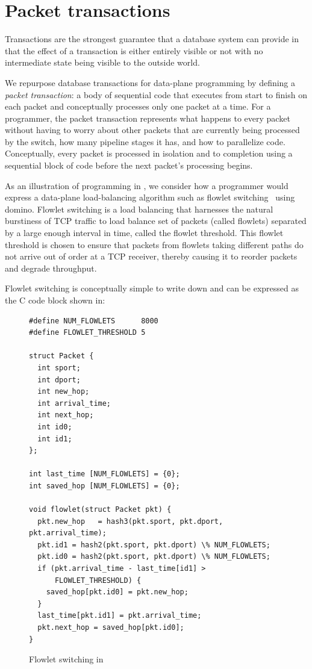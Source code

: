 \section{Packet transactions}
Transactions are the strongest guarantee that a database system can provide in
that the effect of a transaction is either entirely visible or not with no
intermediate state being visible to the outside world.

We repurpose database transactions for data-plane programming by defining a
\textit{packet transaction}: a body of sequential code that executes from start
to finish on each packet and conceptually processes only one packet at a time.
For a programmer, the packet transaction represents what happens to every
packet without having to worry about other packets that are currently being
processed by the switch, how many pipeline stages it has, and how to
parallelize code. Conceptually, every packet is processed in isolation and to
completion using a sequential block of code before the next packet's processing
begins.

As an illustration of programming in \pktlanguage, we consider how a programmer
would express a data-plane load-balancing algorithm such as flowlet
switching~\cite{flowlet} using domino. Flowlet switching is a load balancing
that harnesses the natural burstiness of TCP traffic to load balance set of
packets (called flowlets) separated by a large enough interval in time, called
the flowlet threshold. This flowlet threshold is chosen to ensure that packets
from flowlets taking different paths do not arrive out of order at a TCP
receiver, thereby causing it to reorder packets and degrade throughput.

Flowlet switching is conceptually simple to write down and can be expressed
as the C code block shown in:
\begin{figure}[!h]
\begin{scriptsize}
\begin{lstlisting}
#define NUM_FLOWLETS      8000
#define FLOWLET_THRESHOLD 5

struct Packet {
  int sport;
  int dport;
  int new_hop;
  int arrival_time;
  int next_hop;
  int id0;
  int id1;
};

int last_time [NUM_FLOWLETS] = {0};
int saved_hop [NUM_FLOWLETS] = {0};

void flowlet(struct Packet pkt) {
  pkt.new_hop   = hash3(pkt.sport, pkt.dport, pkt.arrival_time);
  pkt.id1 = hash2(pkt.sport, pkt.dport) \% NUM_FLOWLETS;
  pkt.id0 = hash2(pkt.sport, pkt.dport) \% NUM_FLOWLETS;
  if (pkt.arrival_time - last_time[id1] >
      FLOWLET_THRESHOLD) {
    saved_hop[pkt.id0] = pkt.new_hop;
  }
  last_time[pkt.id1] = pkt.arrival_time;
  pkt.next_hop = saved_hop[pkt.id0];
}
\end{lstlisting}
\end{scriptsize}
\caption{Flowlet switching in \pktlanguage}
\label{fig:flowlet}
\end{figure}

